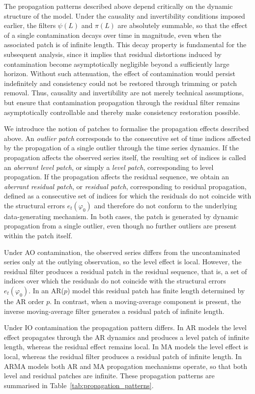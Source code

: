 \documentclass[12pt]{article}
\numberwithin{equation}{section}
\begin{document}
The propagation patterns described above depend critically on the dynamic structure of the model.
Under the causality and invertibility conditions imposed earlier, the filters $\psi(L)$ and $\pi(L)$ are absolutely summable, so that the effect of a single contamination decays over time in magnitude, even when the associated patch is of infinite length.
This decay property is fundamental for the subsequent analysis, since it implies that residual distortions induced by contamination become asymptotically negligible beyond a sufficiently large horizon.
Without such attenuation, the effect of contamination would persist indefinitely and consistency could not be restored through trimming or patch removal.
Thus, causality and invertibility are not merely technical assumptions, but ensure that contamination propagation through the residual filter remains asymptotically controllable and thereby make consistency restoration possible.

We introduce the notion of patches to formalise the propagation effects described above.
An \emph{outlier patch} corresponds to the consecutive set of time indices affected by the propagation of a single outlier through the time series dynamics.
If the propagation affects the observed series itself, the resulting set of indices is called an \emph{aberrant level patch}, or simply a \emph{level patch}, corresponding to level propagation. 
If the propagation affects the residual sequence, we obtain an \emph{aberrant residual patch}, or \emph{residual patch}, corresponding to residual propagation, defined as a consecutive set of indices for which the residuals do not coincide with the structural errors $e_t(\varphi_0)$ and therefore do not conform to the underlying data-generating mechanism.
In both cases, the patch is generated by dynamic propagation from a single outlier, even though no further outliers are present within the patch itself.

Under AO contamination, the observed series differs from the uncontaminated series only at the outlying observation, so the level effect is local. 
However, the residual filter produces a residual patch in the residual sequence, that is, a set of indices over which the residuals do not coincide with the structural errors $e_t(\varphi_0)$. 
In an AR($p$) model this residual patch has finite length determined by the AR order $p$. 
In contrast, when a moving-average component is present, the inverse moving-average filter generates a residual patch of infinite length.

Under IO contamination the propagation pattern differs. 
In AR models the level effect propagates through the AR dynamics and produces a level patch of infinite length, whereas the residual effect remains local.
In MA models the level effect is local, whereas the residual filter produces a residual patch of infinite length. 
In ARMA models both AR and MA propagation mechanisms operate, so that both level and residual patches are infinite. 
These propagation patterns are summarised in Table~\ref{tab:propagation_patterns}.
\end{document}
